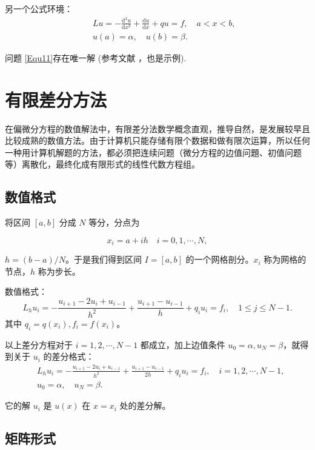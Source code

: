 \documentclass{shnuthesis}
\begin{document}
另一个公式环境：
\begin{eqnarray}\label{Equ12}
&& \displaystyle L u=-\frac{\mathrm{d}^{2} u}{\mathrm{d} x^{2}}+\frac{\mathrm{d} u}{\mathrm{d} x}+q u=f, \quad a < x < b, \\
&& \displaystyle u(a)=\alpha, \quad u(b)=\beta.
\end{eqnarray}

问题 \eqref{Equ11}存在唯一解 (参考文献 \cite{Tadmor2012}，也是示例).


\section{有限差分方法}
在偏微分方程的数值解法中，有限差分法数学概念直观，推导自然，是发展较早且比较成熟的数值方法。由于计算机只能存储有限个数据和做有限次运算，所以任何一种用计算机解题的方法，都必须把连续问题（微分方程的边值问題、初值问题等）离散化，最终化成有限形式的线性代数方程组。


\subsection{数值格式}
将区间 $[a,b]$ 分成 $N$ 等分，分点为

$$x_{i}=a+i h \quad i=0,1, \cdots, N,$$

$h=(b-a) / N$。于是我们得到区间 $I=[a,b]$ 的一个网格剖分。$x_i$ 称为网格的节点，$h$ 称为步长。

数值格式：
$$L_{h} u_{i}=-\frac{u_{i+1}-2 u_{i}+u_{i-1}}{h^{2}}+\frac{u_{i+1}-u_{i-1}}{h}+q_{i} u_{i}=f_{i},\quad 1 \leqslant j \leqslant N-1.$$
其中  $q_{i}=q(x_{i}), f_{i}=f(x_{i})$。

以上差分方程对于 $i=1,2, \cdots, N-1$ 都成立，加上边值条件 $u_{0}=\alpha, u_{N}=\beta$，就得到关于 $u_i$ 的差分格式：
$$\begin{aligned}
& L_{h} u_{i}=-\frac{u_{i+1}-2 u_{i}+u_{i-1}}{h^{2}}+\frac{u_{i+1}-u_{i-1}}{2h}+q_{i} u_{i}=f_{i}, \quad i=1,2, \cdots, N-1, \\
& u_{0}=\alpha, \quad u_{N}=\beta.
\end{aligned}$$

它的解 $u_i$ 是 $u(x)$ 在 $x=x_i$ 处的差分解。



\subsection{矩阵形式}
\end{document}
